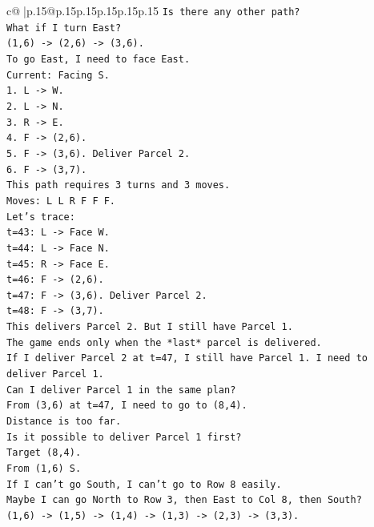 \documentclass{article}
\begin{document}
{\begin{supertabular}{c@{$\;$}|p{.15\linewidth}@{}p{.15\linewidth}p{.15\linewidth}p{.15\linewidth}p{.15\linewidth}p{.15\linewidth}}
{{{\texttt{Is there any other path?} \\
\texttt{What if I turn East?} \\
\texttt{(1,6) {-}> (2,6) {-}> (3,6).} \\
\texttt{To go East, I need to face East.} \\
\texttt{Current: Facing S.} \\
\texttt{1. L {-}> W.} \\
\texttt{2. L {-}> N.} \\
\texttt{3. R {-}> E.} \\
\texttt{4. F {-}> (2,6).} \\
\texttt{5. F {-}> (3,6). Deliver Parcel 2.} \\
\texttt{6. F {-}> (3,7).} \\
\texttt{This path requires 3 turns and 3 moves.} \\
\texttt{Moves: L L R F F F.} \\
\texttt{Let's trace:} \\
\texttt{t=43: L {-}> Face W.} \\
\texttt{t=44: L {-}> Face N.} \\
\texttt{t=45: R {-}> Face E.} \\
\texttt{t=46: F {-}> (2,6).} \\
\texttt{t=47: F {-}> (3,6). Deliver Parcel 2.} \\
\texttt{t=48: F {-}> (3,7).} \\
\texttt{This delivers Parcel 2. But I still have Parcel 1.} \\
\texttt{The game ends only when the *last* parcel is delivered.} \\
\texttt{If I deliver Parcel 2 at t=47, I still have Parcel 1. I need to deliver Parcel 1.} \\
\texttt{Can I deliver Parcel 1 in the same plan?} \\
\texttt{From (3,6) at t=47, I need to go to (8,4).} \\
\texttt{Distance is too far.} \\
\texttt{Is it possible to deliver Parcel 1 first?} \\
\texttt{Target (8,4).} \\
\texttt{From (1,6) S.} \\
\texttt{If I can't go South, I can't go to Row 8 easily.} \\
\texttt{Maybe I can go North to Row 3, then East to Col 8, then South?} \\
\texttt{(1,6) {-}> (1,5) {-}> (1,4) {-}> (1,3) {-}> (2,3) {-}> (3,3).} \\
}}}
\end{supertabular}}
\end{document}

